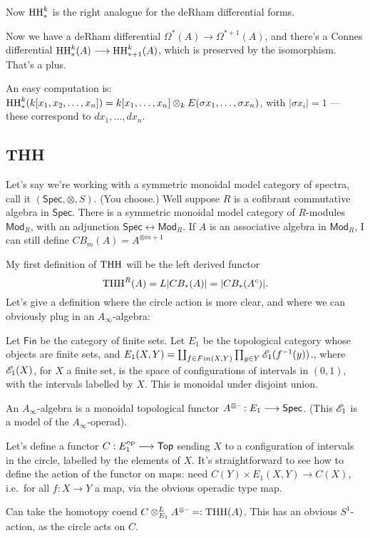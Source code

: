 \begin{GeoffroyTopologicalHochschildHomology}
\begin{enumerate}
\begin{thm*}
Now $\textup{HH}_*^k$ is the right analogue for the deRham differential forms.

Now we have a deRham differential $\Omega^*(A)\to\Omega^{*+1}(A)$, and there's a Connes differential $\textup{HH}_*^k(A)\longrightarrow \textup{HH}_{*+1}^k(A)$, which is preserved by the isomorphism. That's a plus.
\end{thm*}
An easy computation is:
$\textup{HH}_*^k(k[x_1,x_2,\ldots,x_n])=k[x_1,\ldots,x_n]\otimes_k E(\sigma x_1,\ldots,\sigma x_n)$, with $|\sigma x_i|=1$ --- these correspond to $d x_1,\ldots, d x_n$.
\end{enumerate}
\subsection*{THH}
Let's say we're working with a symmetric monoidal model category of spectra, call it $(\mathsf{Spec},\otimes,S)$. (You choose.) Well suppose $R$ is a cofibrant commutative algebra in $\mathsf{Spec}$. There is a symmetric monoidal model category of $R$-modules $\mathsf{Mod}_R$, with an adjunction $\mathsf{Spec}\longleftrightarrow \mathsf{Mod}_R$. 
If $A$ is an associative algebra in $\mathsf{Mod}_R$, I can still define $CB_m(A)=A^{\otimes m+1}$

My first definition of $\textup{THH}$ will be the left derived functor
\[\textup{THH}^R(A)=L|CB_*(A)|=|CB_*(A^c)|.\]
Let's give a definition where the circle action is more clear, and where we can obviously plug in an $A_\infty$-algebra:
\begin{defn*} 
Let $\mathsf{Fin}$ be the category of finite sets. Let $E_1$ be the topological category whose objects are finite sets, and $E_1(X,Y)=\coprod_{f\in Fin(X,Y)}\prod_{y\in Y} \mathscr{E}_1(f^{-1}(y))$., where $\mathscr{E}_1(X)$, for $X$ a finite set, is the space of configurations of intervals in $(0,1)$, with the intervals labelled by $X$.
 This is monoidal under disjoint union.

An $A_\infty$-algebra is a monoidal topological functor $A^{\otimes\textup{--}}:E_1\longrightarrow\mathsf{Spec}$. (This $\mathscr{E}_1$ is a model of the $A_\infty$-operad).

Let's define a functor $C:E_1^{\textup{op}}\longrightarrow\operatorname{{\mathsf{Top}}}$ sending $X$ to a configuration of intervals in the circle, labelled by the elements of $X$. It's straightforward to see how to define the action of the functor on maps: need $C(Y)\times E_1(X,Y)\to C(X)$, i.e.\ for all $f:X\to Y$ a map, via the obvious operadic type map.
\end{defn*}
Can take the homotopy coend $C\otimes_{E_1}^L A^{\otimes\textup{--}}=:\textup{THH}(A)$. This has an obvious $S^1$-action, as the circle acts on $C$.

\end{GeoffroyTopologicalHochschildHomology}
